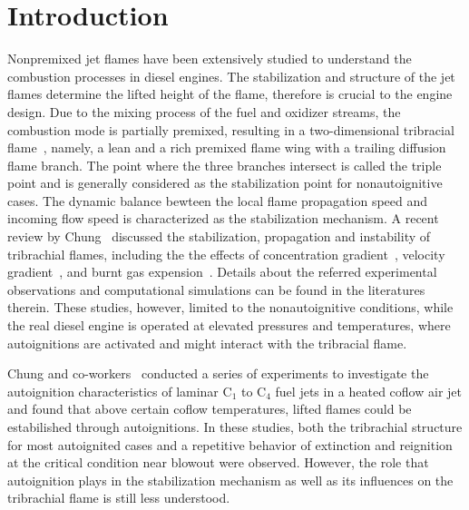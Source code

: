 \documentclass[review,3p,times]{elsarticleUS}
\begin{document}
\section{Introduction}

Nonpremixed jet flames have been extensively studied to understand the combustion processes in diesel engines.  The stabilization and structure of the jet flames determine the lifted height of the flame, therefore is crucial to the engine design.  Due to the mixing process of the fuel and oxidizer streams, the combustion mode is partially premixed, resulting in a two-dimensional tribracial flame~\cite{buckmaster02}, namely, a lean and a rich premixed flame wing with a trailing diffusion flame branch.  The point where the three branches intersect is called the triple point and is generally considered as the stabilization point for nonautoignitive cases. The dynamic balance bewteen the local flame propagation speed and incoming flow speed is characterized as the stabilization mechanism.  A recent review by Chung~\cite{chung07} discussed the stabilization, propagation and instability of tribrachial flames, including the the effects of concentration gradient~\cite{17-19}, velocity gradient~\cite{37}, and burnt gas expension~\cite{14,25-27}.  Details about the referred experimental observations and computational simulations can be found in the literatures therein. These studies, however, limited to the nonautoignitive conditions, while the real diesel engine is operated at elevated pressures and temperatures, where autoignitions are activated and might interact with the tribracial flame. 

Chung and co-workers~\cite{choi09,choi10,choi12} conducted a series of experiments to investigate the autoignition characteristics of laminar C$_1$ to C$_4$ fuel jets in a heated coflow air jet and found that above certain coflow temperatures, lifted flames could be estabilished through autoignitions.  In these studies, both the tribrachial structure for most autoignited cases and a repetitive behavior of extinction and reignition at the critical condition near blowout were observed.  However, the role that autoignition plays in the stabilization mechanism as well as its influences on the tribrachial flame is still less understood.  
\end{document}
